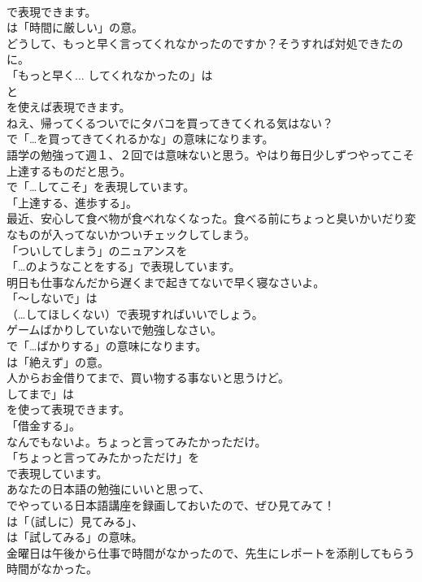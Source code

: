 \documentclass[8pt]{extreport}
\begin{document}
\begin{CJK}{UTF8}{min}
\\	で表現できます。
\\	は「時間に厳しい」の意。	
\\	どうして、もっと早く言ってくれなかったのですか？そうすれば対処できたのに。 
\\	「もっと早く... してくれなかったの」は
\\	と
\\	を使えば表現できます。	
\\	ねえ、帰ってくるついでにタバコを買ってきてくれる気はない？ 
\\	で「…を買ってきてくれるかな」の意味になります。	
\\	語学の勉強って週１、２回では意味ないと思う。やはり毎日少しずつやってこそ上達するものだと思う。 
\\	で「…してこそ」を表現しています。
\\	「上達する、進歩する」。	
\\	最近、安心して食べ物が食べれなくなった。食べる前にちょっと臭いかいだり変なものが入ってないかついチェックしてしまう。 
\\	「ついしてしまう」のニュアンスを
\\	「…のようなことをする」で表現しています。	
\\	明日も仕事なんだから遅くまで起きてないで早く寝なさいよ。 
\\	「～しないで」は
\\	（…してほしくない）で表現すればいいでしょう。	
\\	ゲームばかりしていないで勉強しなさい。 
\\	で「…ばかりする」の意味になります。
\\	は「絶えず」の意。	
\\	人からお金借りてまで、買い物する事ないと思うけど。 
\\	してまで」は
\\	を使って表現できます。
\\	「借金する」。	
\\	なんでもないよ。ちょっと言ってみたかっただけ。 
\\	「ちょっと言ってみたかっただけ」を 
\\	で表現しています。	
\\	あなたの日本語の勉強にいいと思って、
\\	でやっている日本語講座を録画しておいたので、ぜひ見てみて！ 
\\	は「（試しに）見てみる」、
\\	は「試してみる」の意味。	
\\	金曜日は午後から仕事で時間がなかったので、先生にレポートを添削してもらう時間がなかった。 

\end{CJK}
\end{document}
